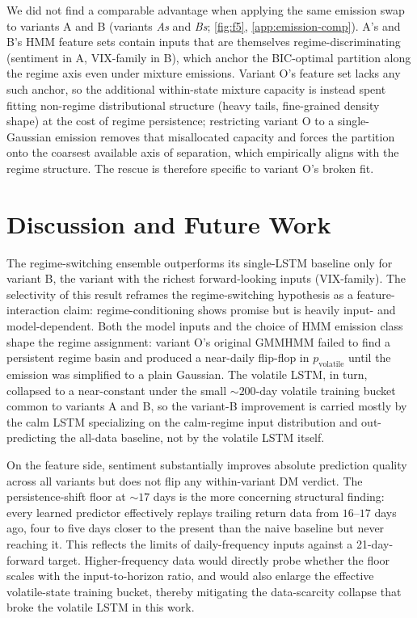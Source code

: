 \documentclass{article}
\begin{document}
We did not find a comparable advantage when applying the same emission swap to variants A and B (variants \emph{As} and \emph{Bs}; \cref{fig:f5}, \cref{app:emission-comp}). A's and B's HMM feature sets contain inputs that are themselves regime-discriminating (sentiment in A, VIX-family in B), which anchor the BIC-optimal partition along the regime axis even under mixture emissions. Variant O's feature set lacks any such anchor, so the additional within-state mixture capacity is instead spent fitting non-regime distributional structure (heavy tails, fine-grained density shape) at the cost of regime persistence; restricting variant O to a single-Gaussian emission removes that misallocated capacity and forces the partition onto the coarsest available axis of separation, which empirically aligns with the regime structure. The rescue is therefore specific to variant O's broken fit.

\section{Discussion and Future Work}
\label{sec:discussion}

The regime-switching ensemble outperforms its single-LSTM baseline only for variant B, the variant with the richest forward-looking inputs (VIX-family). The selectivity of this result reframes the regime-switching hypothesis as a feature-interaction claim: regime-conditioning shows promise but is heavily input- and model-dependent. Both the model inputs and the choice of HMM emission class shape the regime assignment: variant O's original GMMHMM failed to find a persistent regime basin and produced a near-daily flip-flop in $p_{\mathrm{volatile}}$ until the emission was simplified to a plain Gaussian. The volatile LSTM, in turn, collapsed to a near-constant under the small ${\sim}200$-day volatile training bucket common to variants A and B, so the variant-B improvement is carried mostly by the calm LSTM specializing on the calm-regime input distribution and out-predicting the all-data baseline, not by the volatile LSTM itself.

On the feature side, sentiment substantially improves absolute prediction quality across all variants but does not flip any within-variant DM verdict. The persistence-shift floor at $\sim 17$ days is the more concerning structural finding: every learned predictor effectively replays trailing return data from $16$--$17$ days ago, four to five days closer to the present than the naive baseline but never reaching it. This reflects the limits of daily-frequency inputs against a 21-day-forward target. Higher-frequency data would directly probe whether the floor scales with the input-to-horizon ratio, and would also enlarge the effective volatile-state training bucket, thereby mitigating the data-scarcity collapse that broke the volatile LSTM in this work.
\end{document}
